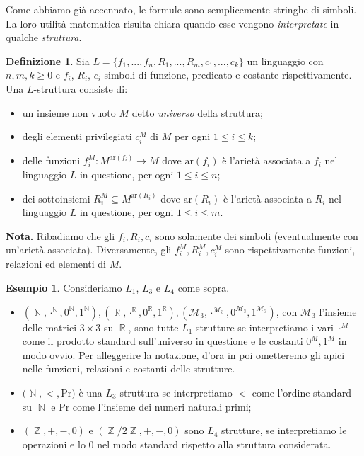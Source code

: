 \documentclass[12pt,a4paper]{report}
\theoremstyle{definition}
\newtheorem{defn}[teo]{Definizione}  %
\newtheorem{es}[teo]{Esempio}  %
\theoremstyle{num.custom-title}
\DeclareMathOperator{\N}{\mathbb{N}}
\DeclareMathOperator{\R}{\mathbb{R}}
\DeclareMathOperator{\Z}{\mathbb{Z}}
\DeclareMathOperator{\sse}{\subseteq}
\begin{document}
Come abbiamo già accennato, le formule sono semplicemente stringhe di simboli. La loro utilità matematica risulta chiara quando esse vengono \emph{interpretate} in qualche \emph{struttura}.

\begin{defn}
Sia $L=\{f_1,...,f_n,R_1,...,R_m, c_1,...,c_k\}$ un linguaggio con $n,m,k \geq 0$ e $f_i$, $R_i$, $c_i$ simboli di funzione, predicato e costante rispettivamente. Una $L$-struttura consiste di:
\begin{itemize}
\item un insieme non vuoto $M$ detto \emph{universo} della struttura;
\item degli elementi privilegiati $c_i^M$ di $M$ per ogni $1 \leq i \leq k$;
\item delle funzioni $f_i^M : M^{\text{ar}(f_i)} \to M$ dove $\text{ar}(f_i)$ è l'arietà associata a $f_i$ nel linguaggio $L$ in questione, per ogni $1 \leq i \leq n$;
\item dei sottoinsiemi $R_i^M \sse M^{\text{ar}(R_i)}$ dove $\text{ar}(R_i)$ è l'arietà associata a $R_i$ nel linguaggio $L$ in questione, per ogni $1 \leq i \leq m$.
\end{itemize}
\textbf{Nota.} Ribadiamo che gli $f_i,R_i,c_i$ sono solamente dei simboli (eventualmente con un'arietà associata). Diversamente, gli $f_i^M,R_i^M,c_i^M$ sono rispettivamente funzioni, relazioni ed elementi di $M$.
\end{defn}

\begin{es} Consideriamo $L_1$, $L_3$ e $L_4$ come sopra.
\begin{itemize}
\item $(\N,\cdot^{\N},0^{\N},1^{\N}), (\R,\cdot^{\R},0^{\R},1^{\R}), (\mathcal{M}_3,\cdot^{\mathcal{M}_3},0^{\mathcal{M}_3},1^{\mathcal{M}_3})$, con $\mathcal{M}_3$ l'insieme delle matrici $3 \times 3$ su $\R$, sono tutte $L_1$-strutture se interpretiamo i vari $\cdot^M$ come il prodotto standard sull'universo in questione e le costanti $0^M,1^M$ in modo ovvio. Per alleggerire la notazione, d'ora in poi ometteremo gli apici nelle funzioni, relazioni e costanti delle strutture.
\item $(\N,<,$Pr$)$ è una $L_3$-struttura se interpretiamo $<$ come l'ordine standard su $\N$ e Pr come l'insieme dei numeri naturali primi;
\item $(\Z,+,-,0)$ e $(\Z/2\Z,+,-,0)$ sono $L_4$ strutture, se interpretiamo le operazioni e lo $0$ nel modo standard rispetto alla struttura considerata.
\end{itemize}
\end{es}
\end{document}
